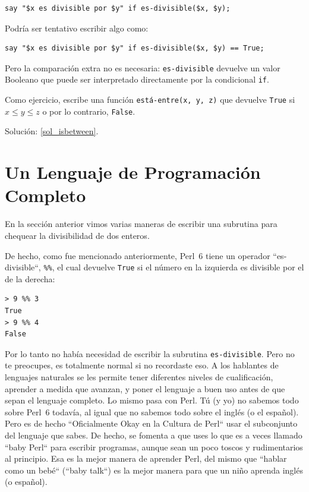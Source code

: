 \begin{lstlisting}
say "$x es divisible por $y" if es-divisible($x, $y);
\end{lstlisting}
%
Podría ser tentativo escribir algo como:

\begin{lstlisting}
say "$x es divisible por $y" if es-divisible($x, $y) == True;
\end{lstlisting}
%
Pero la comparación extra no es necesaria: 
{\tt es-divisible} devuelve un valor Booleano que puede ser
interpretado directamente por la condicional {\tt if}.

\label{isbetween}
Como ejercicio, escribe una función \verb|está-entre(x, y, z)|
que devuelve {\tt True} si $x \le y \le z$ o por lo contrario,
{\tt False}.

Solución: \ref{sol_isbetween}.

\section{Un Lenguaje de Programación Completo}

En la sección anterior vimos varias maneras de escribir
una subrutina para chequear la divisibilidad de dos 
enteros.

De hecho, como fue mencionado anteriormente, Perl~6
tiene un operador ``es-divisible``, \verb|%%|, el cual
devuelve {\tt True} si el número en la izquierda es divisible
por el de la derecha:

\begin{lstlisting}
> 9 %% 3
True
> 9 %% 4
False
\end{lstlisting}

Por lo tanto no había necesidad de escribir la subrutina
{\tt es-divisible}. Pero no te preocupes, es totalmente 
normal si no recordaste eso. A los hablantes de lenguajes 
naturales se les permite tener diferentes niveles de cualificación,
aprender a medida que avanzan, y poner el lenguaje a buen uso 
antes de que sepan el lenguaje completo. Lo mismo pasa con Perl.
Tú (y yo) no sabemos todo sobre Perl~6 todavía, al igual que no
sabemos todo sobre el inglés (o el español). Pero es de hecho 
``Oficialmente Okay en la Cultura de Perl`` usar el subconjunto
del lenguaje que sabes. De hecho, se fomenta a que uses lo que es
a veces llamado ``baby Perl`` para escribir programas, aunque sean
un poco toscos y rudimentarios al principio. Esa es la mejor manera 
de aprender Perl, del mismo que ``hablar como un bebé`` (``baby talk``) es
la mejor manera para que un niño aprenda inglés (o español).

